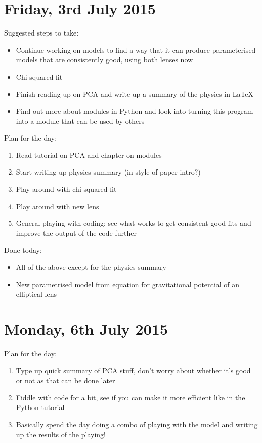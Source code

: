 \documentclass{article}
\begin{document}
\section{Friday, 3rd July 2015}
\noindent Suggested steps to take:
\begin{itemize}
  \item Continue working on models to find a way that it can produce parameterised models that are consistently good, using both lenses now
  \item Chi-squared fit
  \item Finish reading up on PCA and write up a summary of the physics in LaTeX
  \item Find out more about modules in Python and look into turning this program into a module that can be used by others
\end{itemize}

\noindent Plan for the day:
\begin{enumerate}
  \item Read tutorial on PCA and chapter on modules
  \item Start writing up physics summary (in style of paper intro?)
  \item Play around with chi-squared fit
  \item Play around with new lens
  \item General playing with coding: see what works to get consistent good fits and improve the output of the code further
\end{enumerate}

Done today:
\begin{itemize}
  \item All of the above except for the physics summary
  \item New parametrised model from equation for gravitational potential of an elliptical lens
 \end{itemize}\newpage

\section{Monday, 6th July 2015}
\noindent Plan for the day:
\begin{enumerate}
  \item Type up quick summary of PCA stuff, don't worry about whether it's good or not as that can be done later
  \item Fiddle with code for a bit, see if you can make it more efficient like in the Python tutorial
  \item Basically spend the day doing a combo of playing with the model and writing up the results of the playing!
\end{enumerate}
\end{document}

